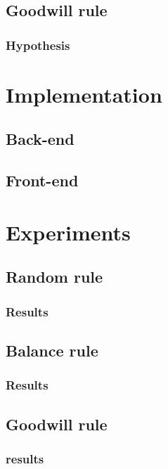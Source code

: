 \documentclass[twoside,openright]{uva-bachelor-thesis}
\begin{document}
\section{Goodwill rule}

\subsection{Hypothesis}

\chapter{Implementation}

\section{Back-end}

\section{Front-end}

\chapter{Experiments}

\section{Random rule}

\subsection{Results}

\section{Balance rule}

\subsection{Results}

\section{Goodwill rule}

\subsection{results}
\end{document}
